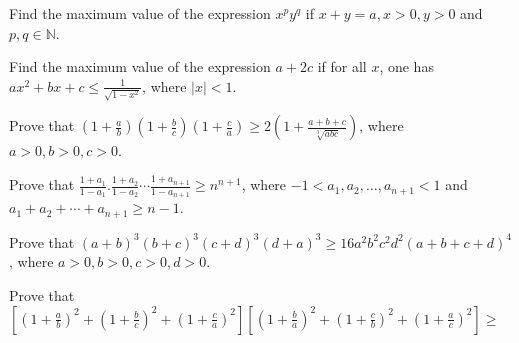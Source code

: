 \item Find the maximum value of the expression $x^py^q$ if $x + y = a, x > 0, y > 0$ and $p, q\in\mathbb{N}$.
\item Find the maximum value of the expression $a + 2c$ if for all $x$, one has $ax^2 + bx + c \leq \frac{1}{\sqrt{1 - x^2}}$,
  where $|x|< 1$.
\item Prove that $\left(1 + \frac{a}{b}\right)\left(1 + \frac{b}{c}\right)\left(1 + \frac{c}{a}\right) \geq 2\left(1 + \frac{a + b
  + c}{\sqrt[3]{abc}}\right)$, where $a > 0, b > 0, c > 0$.
\item Prove that $\frac{1 + a_1}{1 - a_1}.\frac{1 + a_2}{1 - a_2}\cdots\frac{1 + a_{n + 1}}{1 - a_{n + 1}}\geq n^{n + 1}$, where $-1 < a_1, a_2,
  \ldots, a_{n + 1} < 1$ and $a_1 + a_2 + \cdots + a_{n + 1}\geq n - 1$.
\item Prove that $(a + b)^3(b + c)^3(c + d)^3(d + a)^3\geq 16a^2b^2c^2d^2(a + b + c + d)^4$, where $a >0, b > 0, c > 0, d > 0$.
\item Prove that $\left[\left(1 + \frac{a}{b}\right)^2 + \left(1 + \frac{b}{c}\right)^2 + \left(1 + \frac{c}{a}\right)^2\right]
  \left[\left(1 + \frac{b}{a}\right)^2 + \left(1 + \frac{c}{b}\right)^2 + \left(1 + \frac{a}{c}\right)^2\right]\geq$

